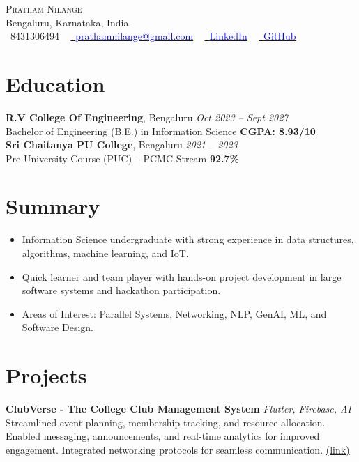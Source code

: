 \documentclass[letterpaper,10.5pt]{article}
\newcommand{\resumeItem}[1]{\item\small{#1}}
\newcommand{\resumeItemListStart}{\begin{itemize}[noitemsep,topsep=0pt,parsep=0pt,partopsep=0pt]}
\newcommand{\resumeItemListEnd}{\end{itemize}}
\begin{document}
\begin{center}
    {\Huge \scshape Pratham Nilange} \\ \vspace{1pt}
    Bengaluru, Karnataka, India \\ \vspace{1pt}
    \small \faPhone\ 8431306494 ~ 
    \href{mailto:prathamnilange@gmail.com}{\faEnvelope\ \textcolor{blue}{prathamnilange@gmail.com}} ~ 
    \href{https://www.linkedin.com/in/pratham-nilange-b55773293/}{\faLinkedin\ \textcolor{blue}{LinkedIn}} ~
    \href{https://github.com/Protham1}{\faGithub\ \textcolor{blue}{GitHub}}
\end{center}

\section*{Education}
\noindent
\textbf{R.V College Of Engineering}, Bengaluru \hfill \textit{Oct 2023 -- Sept 2027} \\
Bachelor of Engineering (B.E.) in Information Science \hfill \textbf{CGPA: 8.93/10} \\[6pt]

\noindent
\textbf{Sri Chaitanya PU College}, Bengaluru \hfill \textit{2021 -- 2023} \\
Pre-University Course (PUC) – PCMC Stream \hfill \textbf{92.7\%}

\section{Summary}
\resumeItemListStart
    \resumeItem{Information Science undergraduate with strong experience in data structures, algorithms, machine learning, and IoT.}
    \resumeItem{Quick learner and team player with hands-on project development in large software systems and hackathon participation.}
    \resumeItem{Areas of Interest: Parallel Systems, Networking, NLP, GenAI, ML, and Software Design.}
\resumeItemListEnd

\section*{Projects}
\noindent
\textbf{ClubVerse - The College Club Management System} \textit{Flutter, Firebase, AI} \\
Streamlined event planning, membership tracking, and resource allocation. Enabled messaging, announcements, and real-time analytics for improved engagement. Integrated networking protocols for seamless communication. \href{https://github.com/Protham1/Clubs}{(link)} \\[6pt]
\end{document}
